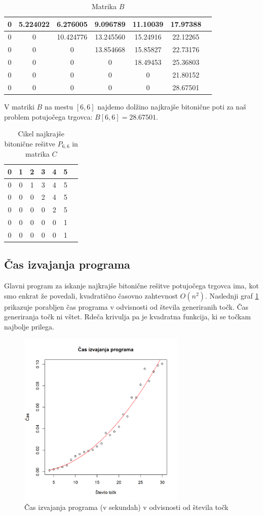 \documentclass[12pt,a4paper]{amsart}
\theoremstyle{definition}
\theoremstyle{plain}
\begin{document}
\begin{table}[htb]
  \begin{tabular}{|c|c|c|c|c|c|c|}
    \hline
    0 & 5.224022 & 6.276005 & 9.096789 & 11.10039 & 17.97388 \\
    \hline
    0 & 0 & 10.424776 & 13.245560 & 15.24916 & 22.12265 \\
    \hline
    0 & 0 & 0 & 13.854668 & 15.85827 & 22.73176 \\
    \hline
    0 & 0 & 0 & 0 & 18.49453 & 25.36803 \\
    \hline
    0 & 0 & 0 & 0 & 0 & 21.80152 \\
    \hline
    0 & 0 & 0 & 0 & 0 & 28.67501 \\
    \hline
  \end{tabular}
  \caption*{Matrika $B$}
\end{table}

\noindent
V matriki $B$ na mestu $[6,6]$ najdemo dolžino najkrajše bitonične poti za naš problem potujočega trgovca: 
$B[6,6] = 28.67501.$

\begin{table}[h]
  \quad%
  \begin{tabular}{|c|c|c|c|c|c|c|}
    \hline
    0 & 1 & 2 & 3 & 4 & 5 \\
    \hline
    0 & 0 & 1 & 3 & 4 & 5 \\
    \hline
    0 & 0 & 0 & 2 & 4 & 5 \\
    \hline
    0 & 0 & 0 & 0 & 2 & 5 \\
    \hline
    0 & 0 & 0 & 0 & 0 & 1 \\
    \hline
    0 & 0 & 0 & 0 & 0 & 1 \\
    \hline
  \end{tabular}
  \caption*{Cikel najkrajše bitonične rešitve $P_{6,6}$ in matrika $C$}
\end{table}


\subsection[]{Čas izvajanja programa}
Glavni program za iskanje najkrajše bitonične rešitve potujočega trgovca ima, kot smo enkrat že
povedali, kvadratično časovno zahtevnost $O(n^2).$ Naslednji graf \ref{slika:cas_izvajanja} prikazuje porabljen čas programa v 
odvisnosti od števila generiranih točk. Čas generiranja točk ni vštet. Rdeča krivulja pa je kvadratna funkcija,
ki se točkam najbolje prilega.

\begin{figure}[h]
  \includegraphics[width=8cm]{Slike grafov/cas_izvajanja.png}
  \caption{Čas izvajanja programa (v sekundah) v odvisnosti od števila točk}
  \label{slika:cas_izvajanja}
\end{figure}
\end{document}
